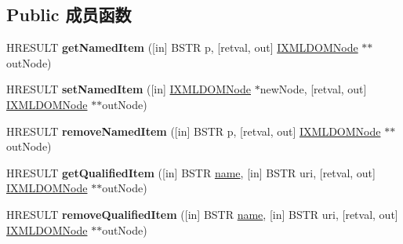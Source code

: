 \subsection*{Public 成员函数}
\begin{DoxyCompactItemize}
\item 
\mbox{\label{interface_m_s_x_m_l2_1_1_i_x_m_l_d_o_m_named_node_map_ac027b2660e71cbd7c2b17e4d7b0f5d8b}} 
H\+R\+E\+S\+U\+LT {\bfseries get\+Named\+Item} (\mbox{[}in\mbox{]} B\+S\+TR p, \mbox{[}retval, out\mbox{]} \hyperlink{interface_m_s_x_m_l2_1_1_i_x_m_l_d_o_m_node}{I\+X\+M\+L\+D\+O\+M\+Node} $\ast$$\ast$out\+Node)
\item 
\mbox{\label{interface_m_s_x_m_l2_1_1_i_x_m_l_d_o_m_named_node_map_a166c28287818d90b3e5c91b38ec03563}} 
H\+R\+E\+S\+U\+LT {\bfseries set\+Named\+Item} (\mbox{[}in\mbox{]} \hyperlink{interface_m_s_x_m_l2_1_1_i_x_m_l_d_o_m_node}{I\+X\+M\+L\+D\+O\+M\+Node} $\ast$new\+Node, \mbox{[}retval, out\mbox{]} \hyperlink{interface_m_s_x_m_l2_1_1_i_x_m_l_d_o_m_node}{I\+X\+M\+L\+D\+O\+M\+Node} $\ast$$\ast$out\+Node)
\item 
\mbox{\label{interface_m_s_x_m_l2_1_1_i_x_m_l_d_o_m_named_node_map_afe908ace988c9a6a7e35662eaea862d9}} 
H\+R\+E\+S\+U\+LT {\bfseries remove\+Named\+Item} (\mbox{[}in\mbox{]} B\+S\+TR p, \mbox{[}retval, out\mbox{]} \hyperlink{interface_m_s_x_m_l2_1_1_i_x_m_l_d_o_m_node}{I\+X\+M\+L\+D\+O\+M\+Node} $\ast$$\ast$out\+Node)
\item 
\mbox{\label{interface_m_s_x_m_l2_1_1_i_x_m_l_d_o_m_named_node_map_a54e97ea369d5d4dbf6e9cb3016a5011c}} 
H\+R\+E\+S\+U\+LT {\bfseries get\+Qualified\+Item} (\mbox{[}in\mbox{]} B\+S\+TR \hyperlink{structname}{name}, \mbox{[}in\mbox{]} B\+S\+TR uri, \mbox{[}retval, out\mbox{]} \hyperlink{interface_m_s_x_m_l2_1_1_i_x_m_l_d_o_m_node}{I\+X\+M\+L\+D\+O\+M\+Node} $\ast$$\ast$out\+Node)
\item 
\mbox{\label{interface_m_s_x_m_l2_1_1_i_x_m_l_d_o_m_named_node_map_a4c6e8120c7b8f5ea03817bd82a96f901}} 
H\+R\+E\+S\+U\+LT {\bfseries remove\+Qualified\+Item} (\mbox{[}in\mbox{]} B\+S\+TR \hyperlink{structname}{name}, \mbox{[}in\mbox{]} B\+S\+TR uri, \mbox{[}retval, out\mbox{]} \hyperlink{interface_m_s_x_m_l2_1_1_i_x_m_l_d_o_m_node}{I\+X\+M\+L\+D\+O\+M\+Node} $\ast$$\ast$out\+Node)
$$
\end{DoxyCompactItemize}
